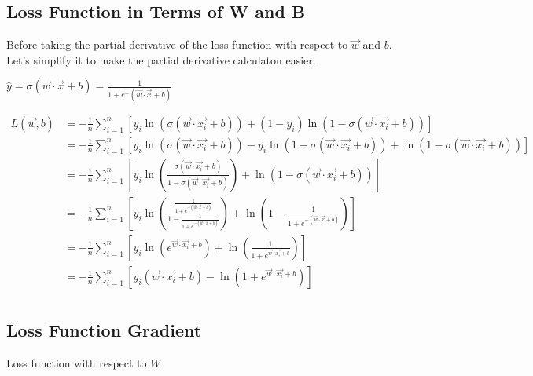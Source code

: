 \documentclass[11pt]{article}
\begin{document}
    \subsection{Loss Function in Terms of W and
B}\label{loss-function-in-terms-of-w-and-b}

Before taking the partial derivative of the loss function with respect
to \(\vec{w}\) and \(b\). Let's simplify it to make the partial
derivative calculaton easier.

\(\hat y = \sigma{(\vec{w} \cdot \vec{x} + b)} = \frac{1}{1+e^-(\vec{w} \cdot \vec{x} + b)}\)

\begin{align*}
L(\vec{w}, b) &= -\frac{1}{n}  \sum_{i=1}^{n}[ y_i \ln(\sigma{(\vec{w} \cdot \vec{x_i} + b)}) + (1-y_i) \ln(1 - \sigma{(\vec{w} \cdot \vec{x_i} + b)})] \\ 
&= -\frac{1}{n}  \sum_{i=1}^{n}[ y_i \ln(\sigma{(\vec{w} \cdot \vec{x_i} + b)}) - y_i \ln(1 - \sigma{(\vec{w} \cdot \vec{x_i} + b)}) + \ln(1 - \sigma{(\vec{w} \cdot \vec{x_i} + b)})] \\ 
&= -\frac{1}{n}  \sum_{i=1}^{n}[ y_i \ln(\frac{\sigma{(\vec{w} \cdot \vec{x_i} + b)}}{1 - \sigma{(\vec{w} \cdot \vec{x_i} + b)}}) + \ln(1 - \sigma{(\vec{w} \cdot \vec{x_i} + b)})] \\
&= -\frac{1}{n}  \sum_{i=1}^{n}[ y_i \ln(\frac{\frac{1}{1+e^{-(\vec{w} \cdot \vec{x} + b)}}}{1 - \frac{1}{1+e^{-(\vec{w} \cdot \vec{x} + b)}}}) + \ln(1 - \frac{1}{1+e^{-(\vec{w} \cdot \vec{x} + b)}})] \\
&= -\frac{1}{n} \sum_{i=1}^{n} [y_i \ln(e^{\vec{w} \cdot \vec{x_i} + b}) + \ln(\frac{1}{1+e^{\vec{w} \cdot \vec{x_i} + b}})] \\ 
&= -\frac{1}{n} \sum_{i=1}^{n} [y_i (\vec{w} \cdot \vec{x_i} + b) - \ln(1+e^{\vec{w} \cdot \vec{x_i} + b})] \\ 
\end{align*}

    \subsection{Loss Function Gradient}\label{loss-function-gradient}

    Loss function with respect to \(W\)
\end{document}
